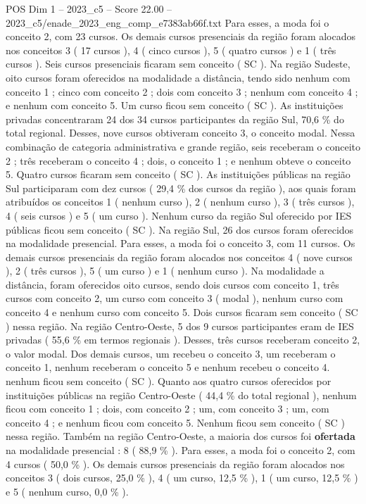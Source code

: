 \begin{textsample}{POS Dim 1 – 2023\_c5 – Score 22.00 – 2023\_c5/enade\_2023\_eng\_comp\_e7383ab66f.txt}
Para esses, a moda foi o conceito 2, com 23 cursos.
Os demais cursos presenciais da região foram alocados nos conceitos 3 ( 17 cursos ), 4 ( cinco cursos ), 5 ( quatro cursos ) e 1 ( três cursos ).
Seis cursos presenciais ficaram sem conceito ( SC ).
Na região Sudeste, oito cursos foram oferecidos na modalidade a distância, tendo sido nenhum com conceito 1 ; cinco com conceito 2 ; dois com conceito 3 ; nenhum com conceito 4 ; e nenhum com conceito 5.
Um curso ficou sem conceito ( SC ).
As instituições privadas concentraram 24 dos 34 cursos participantes da região Sul, 70,6 \% do total regional.
Desses, nove cursos obtiveram conceito 3, o conceito modal.
Nessa combinação de categoria administrativa e grande região, seis receberam o conceito 2 ; três receberam o conceito 4 ; dois, o conceito 1 ; e nenhum obteve o conceito 5.
Quatro cursos ficaram sem conceito ( SC ).
As instituições públicas na região Sul participaram com dez cursos ( 29,4 \% dos cursos da região ), aos quais foram atribuídos os conceitos 1 ( nenhum curso ), 2 ( nenhum curso ), 3 ( três cursos ), 4 ( seis cursos ) e 5 ( um curso ).
Nenhum curso da região Sul oferecido por IES públicas ficou sem conceito ( SC ).
Na região Sul, 26 dos cursos foram oferecidos na modalidade presencial.
Para esses, a moda foi o conceito 3, com 11 cursos.
Os demais cursos presenciais da região foram alocados nos conceitos 4 ( nove cursos ), 2 ( três cursos ), 5 ( um curso ) e 1 ( nenhum curso ).
Na modalidade a distância, foram oferecidos oito cursos, sendo dois cursos com conceito 1, três cursos com conceito 2, um curso com conceito 3 ( modal ), nenhum curso com conceito 4 e nenhum curso com conceito 5.
Dois cursos ficaram sem conceito ( SC ) nessa região.
Na região Centro-Oeste, 5 dos 9 cursos participantes eram de IES privadas ( 55,6 \% em termos regionais ).
Desses, três cursos receberam conceito 2, o valor modal.
Dos demais cursos, um recebeu o conceito 3, um receberam o conceito 1, nenhum receberam o conceito 5 e nenhum recebeu o conceito 4. nenhum ficou sem conceito ( SC ).
Quanto aos quatro cursos oferecidos por instituições públicas na região Centro-Oeste ( 44,4 \% do total regional ), nenhum ficou com conceito 1 ; dois, com conceito 2 ; um, com conceito 3 ; um, com conceito 4 ; e nenhum ficou com conceito 5.
Nenhum ficou sem conceito ( SC ) nessa região.
Também na região Centro-Oeste, a maioria dos cursos foi \textbf{ofertada} na modalidade presencial : 8 ( 88,9 \% ).
Para esses, a moda foi o conceito 2, com 4 cursos ( 50,0 \% ).
Os demais cursos presenciais da região foram alocados nos conceitos 3 ( dois cursos, 25,0 \% ), 4 ( um curso, 12,5 \% ), 1 ( um curso, 12,5 \% ) e 5 ( nenhum curso, 0,0 \% ).

\end{textsample}
